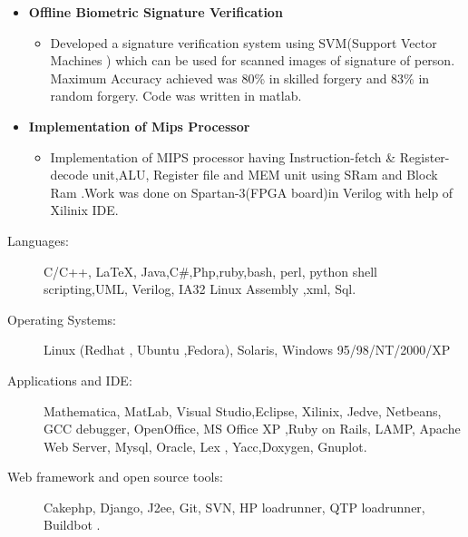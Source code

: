 \documentclass[]{res}
\makeatletter
\newcommand{\resitem}[1]{\item #1 \vspace{-2pt}}
\newcommand{\resheading}[1]{{\large \parashade[.9]{sharpcorners}{\textbf{#1 \vphantom{p\^{E}}}}}}
\newcommand{\ressubheading}[4]{
\begin{tabular*}{6.5in}{l@{\extracolsep{\fill}}r}
		\textbf{#1} & #2 \\
		\textit{#3} & \textit{#4} \\
\end{tabular*}\vspace{-6pt}}
\makeatother
\begin{document}
\begin{itemize}
\vspace{-0.1in}
			\item	 \textbf{Offline Biometric Signature Verification }
	\vspace{-0.1in}	
		\begin{itemize}
		\resitem{ Developed a signature verification system using SVM(Support Vector Machines )  which can be used for scanned images of signature of person. Maximum Accuracy achieved was 80\% in skilled forgery and 83\% in random forgery. Code was written in matlab.		
		 }
		\end{itemize}	
	
\vspace{-0.1in}
\item	\textbf{Implementation of Mips Processor }
		\begin{itemize}
		\vspace{-0.1in}
		\resitem{Implementation of MIPS processor having Instruction-fetch \& Register-decode unit,ALU, Register file and MEM unit using SRam and Block Ram .Work was done on Spartan-3(FPGA board)in Verilog with help of Xilinix IDE.}
	
		\end{itemize}

		

\end{itemize}





\vspace{-0.2in}
\resheading{Skills}
\vspace{-0.2in}
\begin{description}
\item[Languages:]
C/C++, \LaTeX, Java,C\#,Php,ruby,bash, perl, python shell scripting,UML, Verilog, IA32 Linux Assembly ,xml, Sql.
\item[Operating Systems:]
Linux (Redhat , Ubuntu ,Fedora), Solaris, Windows 95/98/NT/2000/XP
\item[Applications and IDE:]
Mathematica, MatLab, Visual Studio,Eclipse, Xilinix, Jedve, Netbeans, GCC debugger, OpenOffice, MS Office XP ,Ruby on Rails, LAMP, Apache Web Server, Mysql, Oracle, Lex , Yacc,Doxygen, Gnuplot.
\item[Web framework and open source tools:]
Cakephp, Django, J2ee, Git, SVN, HP loadrunner, QTP loadrunner, Buildbot .
\end{description}
\end{document}
